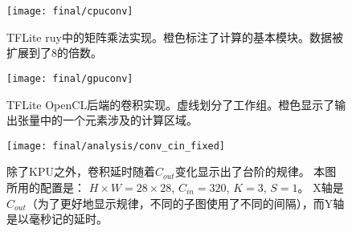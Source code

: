\begin{figure}
    \centering
    \texttt{[image: final/cpuconv]}
    \caption{TFLite ruy中的矩阵乘法实现。橙色标注了计算的基本模块。数据被扩展到了8的倍数。}
    \label{fig:cpuconv}
\end{figure}

\begin{figure}
    \centering
    \texttt{[image: final/gpuconv]}
    \caption{TFLite OpenCL后端的卷积实现。虚线划分了工作组。橙色显示了输出张量中的一个元素涉及的计算区域。}
    \label{fig:gpuconv}
\end{figure}

\begin{figure}
	\centering
	\texttt{[image: final/analysis/conv\_cin\_fixed]}
	\caption{
        除了KPU之外，卷积延时随着$C_{out}$变化显示出了台阶的规律。
        本图所用的配置是：
        $H \times W=28 \times 28$, $C_{in}=320$, $K=3$, $S=1$。
        X轴是$C_{out}$（为了更好地显示规律，不同的子图使用了不同的间隔），而Y轴是以毫秒记的延时。
	}
	\label{fig:conv_cin_fixed}
\end{figure}